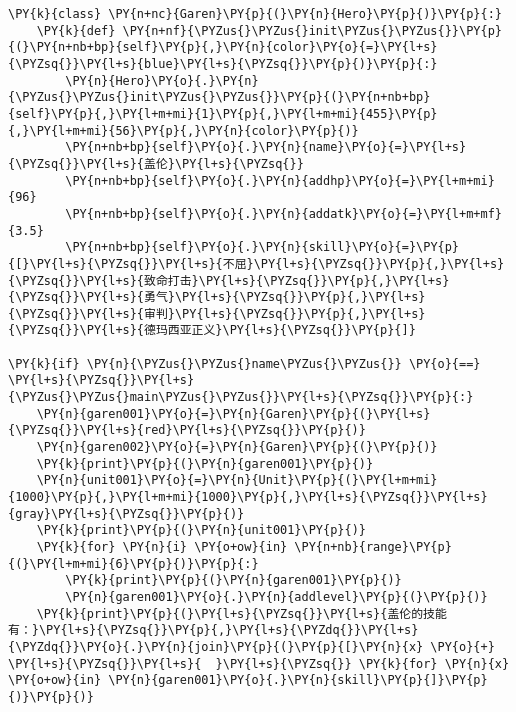 \begin{Verbatim}[commandchars=\\\{\}]
\PY{k}{class} \PY{n+nc}{Garen}\PY{p}{(}\PY{n}{Hero}\PY{p}{)}\PY{p}{:}
    \PY{k}{def} \PY{n+nf}{\PYZus{}\PYZus{}init\PYZus{}\PYZus{}}\PY{p}{(}\PY{n+nb+bp}{self}\PY{p}{,}\PY{n}{color}\PY{o}{=}\PY{l+s}{\PYZsq{}}\PY{l+s}{blue}\PY{l+s}{\PYZsq{}}\PY{p}{)}\PY{p}{:}
        \PY{n}{Hero}\PY{o}{.}\PY{n}{\PYZus{}\PYZus{}init\PYZus{}\PYZus{}}\PY{p}{(}\PY{n+nb+bp}{self}\PY{p}{,}\PY{l+m+mi}{1}\PY{p}{,}\PY{l+m+mi}{455}\PY{p}{,}\PY{l+m+mi}{56}\PY{p}{,}\PY{n}{color}\PY{p}{)}
        \PY{n+nb+bp}{self}\PY{o}{.}\PY{n}{name}\PY{o}{=}\PY{l+s}{\PYZsq{}}\PY{l+s}{盖伦}\PY{l+s}{\PYZsq{}}
        \PY{n+nb+bp}{self}\PY{o}{.}\PY{n}{addhp}\PY{o}{=}\PY{l+m+mi}{96}
        \PY{n+nb+bp}{self}\PY{o}{.}\PY{n}{addatk}\PY{o}{=}\PY{l+m+mf}{3.5}
        \PY{n+nb+bp}{self}\PY{o}{.}\PY{n}{skill}\PY{o}{=}\PY{p}{[}\PY{l+s}{\PYZsq{}}\PY{l+s}{不屈}\PY{l+s}{\PYZsq{}}\PY{p}{,}\PY{l+s}{\PYZsq{}}\PY{l+s}{致命打击}\PY{l+s}{\PYZsq{}}\PY{p}{,}\PY{l+s}{\PYZsq{}}\PY{l+s}{勇气}\PY{l+s}{\PYZsq{}}\PY{p}{,}\PY{l+s}{\PYZsq{}}\PY{l+s}{审判}\PY{l+s}{\PYZsq{}}\PY{p}{,}\PY{l+s}{\PYZsq{}}\PY{l+s}{德玛西亚正义}\PY{l+s}{\PYZsq{}}\PY{p}{]}

\PY{k}{if} \PY{n}{\PYZus{}\PYZus{}name\PYZus{}\PYZus{}} \PY{o}{==} \PY{l+s}{\PYZsq{}}\PY{l+s}{\PYZus{}\PYZus{}main\PYZus{}\PYZus{}}\PY{l+s}{\PYZsq{}}\PY{p}{:}
    \PY{n}{garen001}\PY{o}{=}\PY{n}{Garen}\PY{p}{(}\PY{l+s}{\PYZsq{}}\PY{l+s}{red}\PY{l+s}{\PYZsq{}}\PY{p}{)}
    \PY{n}{garen002}\PY{o}{=}\PY{n}{Garen}\PY{p}{(}\PY{p}{)}
    \PY{k}{print}\PY{p}{(}\PY{n}{garen001}\PY{p}{)}
    \PY{n}{unit001}\PY{o}{=}\PY{n}{Unit}\PY{p}{(}\PY{l+m+mi}{1000}\PY{p}{,}\PY{l+m+mi}{1000}\PY{p}{,}\PY{l+s}{\PYZsq{}}\PY{l+s}{gray}\PY{l+s}{\PYZsq{}}\PY{p}{)}
    \PY{k}{print}\PY{p}{(}\PY{n}{unit001}\PY{p}{)}
    \PY{k}{for} \PY{n}{i} \PY{o+ow}{in} \PY{n+nb}{range}\PY{p}{(}\PY{l+m+mi}{6}\PY{p}{)}\PY{p}{:}
        \PY{k}{print}\PY{p}{(}\PY{n}{garen001}\PY{p}{)}
        \PY{n}{garen001}\PY{o}{.}\PY{n}{addlevel}\PY{p}{(}\PY{p}{)}
    \PY{k}{print}\PY{p}{(}\PY{l+s}{\PYZsq{}}\PY{l+s}{盖伦的技能有：}\PY{l+s}{\PYZsq{}}\PY{p}{,}\PY{l+s}{\PYZdq{}}\PY{l+s}{\PYZdq{}}\PY{o}{.}\PY{n}{join}\PY{p}{(}\PY{p}{[}\PY{n}{x} \PY{o}{+} \PY{l+s}{\PYZsq{}}\PY{l+s}{  }\PY{l+s}{\PYZsq{}} \PY{k}{for} \PY{n}{x} \PY{o+ow}{in} \PY{n}{garen001}\PY{o}{.}\PY{n}{skill}\PY{p}{]}\PY{p}{)}\PY{p}{)}
\end{Verbatim}
